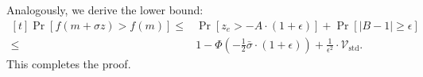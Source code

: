\documentclass[journal]{IEEEtran}
\providecommand{\E}{\mathbb{E}} %
\renewcommand{\geq}{\geqslant} %
\renewcommand{\leq}{\leqslant} %
\theoremstyle{definition}
\begin{document}
Analogously, we derive the lower bound:
\begin{equation}
\begin{aligned}[t]
\Pr\left[f(m + \sigma z) > f(m) \right]
\leq&
\Pr\left[ z_e > - A \cdot(1+\epsilon)\right]
+\Pr\left[ \left| B -1 \right| \geq \epsilon\right]
\\
\leq&
1 - \Phi\left( - \frac12 \bar\sigma\cdot(1+\epsilon)\right)
+ \frac{1}{\epsilon^2} \cdot \mathcal{V}_\mathrm{std}
.
\end{aligned}
\end{equation}
This completes the proof.
\end{document}
